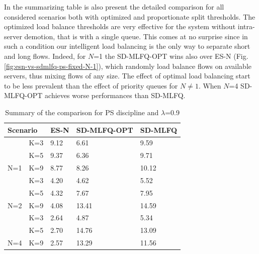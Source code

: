 In the summarizing table is also present the detailed comparison for all considered scenarios both with optimized and proportionate split thresholds. The optimized load balance thresholds are very effective for the system without intra-server demotion, that is with a single queue. This comes at no surprise since in such a condition our intelligent load balancing is the only way to separate short and long flows. Indeed, for $N$=1 the SD-MLFQ-OPT wins also over ES-N (Fig.\ref{fig:esn-vs-sdmlfq-ps-fixed-N-1}), which randomly load balance flows on available servers, thus mixing flows of any size. The effect of optimal load balancing start to be less prevalent than the effect of priority queues for $N \ne 1$. When $N$=4 SD-MLFQ-OPT achieves worse performances than SD-MLFQ. 
\begin{table}[]
	\centering
	\begin{tabular}{lllll}
		\hline
		\multicolumn{2}{l}{{\color[HTML]{000000} Scenario}} &
		{\color[HTML]{000000} ES-N} &
		{\color[HTML]{000000} SD-MLFQ-OPT} &
		{\color[HTML]{000000} SD-MLFQ} \\ \hline
		{\color[HTML]{000000} } &
		{\color[HTML]{000000} K=3} &
		{\color[HTML]{000000} 9.12} &
		{\color[HTML]{000000} 6.61} &
		{\color[HTML]{000000} 9.59} \\
		{\color[HTML]{000000} } &
		{\color[HTML]{000000} K=5} &
		{\color[HTML]{000000} 9.37} &
		{\color[HTML]{000000} 6.36} &
		{\color[HTML]{000000} 9.71} \\
		\multirow{-3}{*}{{\color[HTML]{000000} N=1}} &
		{\color[HTML]{000000} K=9} &
		{\color[HTML]{000000} 8.77} &
		{\color[HTML]{000000} 8.26} &
		{\color[HTML]{000000} 10.12} \\ \hline
		{\color[HTML]{000000} } &
		{\color[HTML]{000000} K=3} &
		{\color[HTML]{000000} 4.20} &
		{\color[HTML]{000000} 4.62} &
		{\color[HTML]{000000} 5.52} \\
		{\color[HTML]{000000} } &
		{\color[HTML]{000000} K=5} &
		{\color[HTML]{000000} 4.32} &
		{\color[HTML]{000000} 7.67} &
		{\color[HTML]{000000} 7.95} \\
		\multirow{-3}{*}{{\color[HTML]{000000} N=2}} &
		{\color[HTML]{000000} K=9} &
		{\color[HTML]{000000} 4.08} &
		{\color[HTML]{000000} 13.41} &
		{\color[HTML]{000000} 14.59} \\ \hline
		{\color[HTML]{000000} } &
		{\color[HTML]{000000} K=3} &
		{\color[HTML]{000000} 2.64} &
		{\color[HTML]{000000} 4.87} &
		{\color[HTML]{000000} 5.34} \\
		{\color[HTML]{000000} } &
		{\color[HTML]{000000} K=5} &
		{\color[HTML]{000000} 2.70} &
		{\color[HTML]{000000} 14.76} &
		{\color[HTML]{000000} 13.09} \\
		\multirow{-3}{*}{{\color[HTML]{000000} N=4}} &
		{\color[HTML]{000000} K=9} &
		{\color[HTML]{000000} 2.57} &
		{\color[HTML]{000000} 13.29} &
		{\color[HTML]{000000} 11.56} \\ \cline{1-5} 
	\end{tabular}
	\caption{Summary of the comparison for PS discipline and $\lambda$=0.9}
	\label{tab:esn-vs-sdmlfq}
\end{table}

